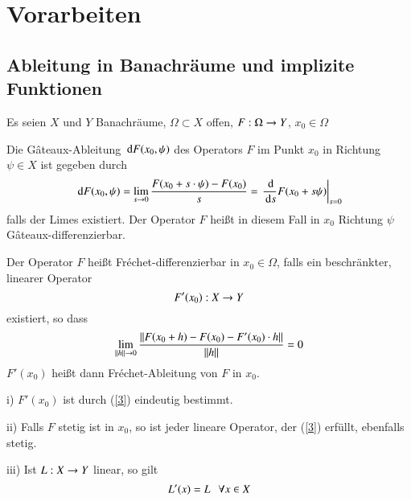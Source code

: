 \section{Vorarbeiten}

\subsection{Ableitung in Banachräume und implizite Funktionen}

Es seien $X$ und $Y$ Banachräume, $\Omega\subset X$ offen, $F:\Omega \rightarrow Y$, $x_0\in \Omega$

\begin{defi}
    Die Gâteaux-Ableitung $\, \mathrm{d} F(x_0,\psi)$ des Operators $F$ im Punkt $x_0$ in Richtung $\psi\in X$ 
    ist gegeben durch 
    \[
        \, \mathrm{d} F (x_0,\psi)=\lim_{s\rightarrow 0} \frac{F(x_0+s\cdot \psi)-F(x_0)}{s}= \left. \frac{\, \mathrm{d}}{\, \mathrm{d} s} 
        F(x_0+s\psi)\right|_{s=0}
    \]
    falls der Limes existiert. Der Operator $F$ heißt in diesem Fall in $x_0$ Richtung $\psi$ 
    Gâteaux-differenzierbar.
\end{defi}
\begin{defi}
    Der Operator $F$ heißt Fréchet-differenzierbar in $x_0\in \Omega$, falls ein beschränkter,
    linearer Operator 
    \[
        F'(x_0):X\rightarrow Y 
    \]
    existiert, so dass 
    \begin{align}\label{3}
        \lim_{\|h\|\rightarrow 0} \frac{\| F(x_0+h) - F(x_0) -F'(x_0)\cdot h \|  }{\|h\|} = 0
    \end{align}
    $F'(x_0)$ heißt dann Fréchet-Ableitung von $F$ in $x_0$.
\end{defi}

\begin{theorem}
    \begin{description}
        \item{i)} $F'(x_0)$ ist durch (\ref{3}) eindeutig bestimmt.
        \item{ii)} Falls $F$ stetig ist in $x_0$, so ist jeder lineare Operator, der (\ref{3}) erfüllt,
                ebenfalls stetig.
        \item{iii)} Ist $L:X\rightarrow Y$ linear, so gilt
                \[
                    L'(x)=L \hspace{.25cm} \forall x\in X
                \]
    \end{description}
\end{theorem}

